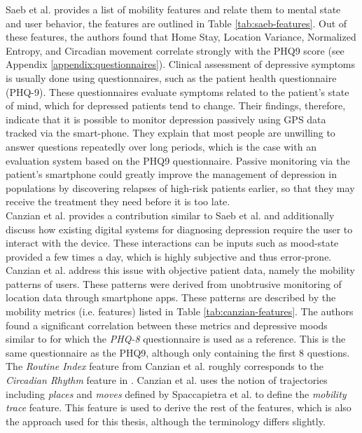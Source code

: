Saeb et al. provides a list of mobility features and relate them to mental state and user behavior, the features are outlined in Table \ref{tab:saeb-features}. Out of these features, the authors found that Home Stay, Location Variance, Normalized Entropy, and Circadian movement correlate strongly with the PHQ9 score (see Appendix \ref{appendix:questionnaires}). Clinical assessment of depressive symptoms is usually done using questionnaires, such as the patient health questionnaire (PHQ-9). These questionnaires evaluate symptoms related to the patient's state of mind, which for depressed patients tend to change. Their findings, therefore, indicate that it is possible to monitor depression passively using GPS data tracked via the smart-phone. They explain that most people are unwilling to answer questions repeatedly over long periods, which is the case with an evaluation system based on the PHQ9 questionnaire. Passive monitoring via the patient's smartphone could greatly improve the management of depression in populations by discovering relapses of high-risk patients earlier, so that they may receive the treatment they need before it is too late. \\



Canzian et al. provides a contribution similar to Saeb et al. and additionally discuss how existing digital systems for diagnosing depression require the user to interact with the device. These interactions can be inputs such as mood-state provided a few times a day, which is highly subjective and thus error-prone. Canzian et al. address this issue with objective patient data, namely the mobility patterns of users. These patterns were derived from unobtrusive monitoring of location data through smartphone apps. These patterns are described by the mobility metrics (i.e. features) listed in Table \ref{tab:canzian-features}. The authors found a significant correlation between these metrics and depressive moods similar to \cite{Saeb2015} for which the \textit{PHQ-8} questionnaire is used as a reference. This is the same questionnaire as the PHQ9, although only containing the first 8 questions. The \textit{Routine Index} feature from Canzian et al. roughly corresponds to the \textit{Circadian Rhythm} feature in \cite{Saeb2015}. Canzian et al. \cite{Canzian2015} uses the notion of trajectories including \textit{places} and \textit{moves} defined by Spaccapietra et al. \cite{trajectories2008} to define the \textit{mobility trace} feature. This feature is used to derive the rest of the features, which is also the approach used for this thesis, although the terminology differs slightly.\\

